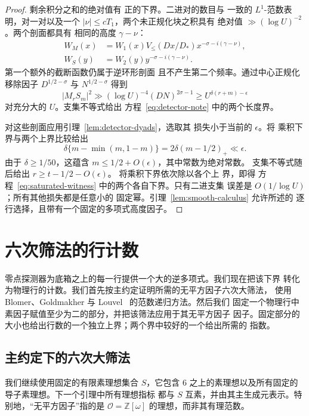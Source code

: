 \begin{proof}
剩余积分之和的绝对值有
正的下界。二进对的数目与
一致的 \(L^1\)-范数表明，对一对以及一个
\(|\nu|\le cT_1\)，两个未正规化块之积具有
绝对值 \(\gg(\log U)^{-2}\)。两个剖面都具有
相同的高度 \(\gamma-\nu\)：
\[
 \begin{split}
 W_M(x)&=W_1(x)V_{\le}(Dx/D_*)x^{-\sigma-i(\gamma-\nu)},\\
 W_S(y)&=W_2(y)y^{-\sigma-i(\gamma-\nu)}.
 \end{split}
\]
第一个额外的截断函数仍属于逆环形剖面
且不产生第二个频率。通过中心正规化移除因子
\(D^{1/2-\sigma}\) 与 \(N^{1/2-\sigma}\)
得到
\[
 |M_rS_m|^2\gg(\log U)^{-4}(DN)^{2\sigma-1}
 \ge U^{\delta(r+m)-\epsilon}
\]
对充分大的 \(U\)。支集不等式给出
方程~\eqref{eq:detector-note} 中的两个长度界。

对这些剖面应用引理~\ref{lem:detector-dyads}，选取其
损失小于当前的 \(\epsilon\)。将
乘积下界与两个上界比较给出
\[
 \delta\{m-\min(m,1-m)\}
   =2\delta(m-1/2)_+\ll\epsilon.
\]
由于 \(\delta\ge1/50\)，这蕴含
\(m\le1/2+O(\epsilon)\)，其中常数为绝对常数。
支集不等式随后给出
\(r\ge t-1/2-O(\epsilon)\)。
将乘积下界依次除以各个上
界，即得
方程~\eqref{eq:saturated-witness} 中的两个各自下界。只有二进支集
误差是 \(O(1/\log U)\)；所有其他损失都是任意小的
固定幂。引理~\ref{lem:smooth-calculus} 允许所述的
逐行选择，且带有一个固定的多项式高度因子。
\end{proof}

\section{六次筛法的行计数}\label{sec:sextic-row-count}

零点探测器为底箱之上的每一行提供一个大的逆多项式。我们现在把该下界
转化为物理行的计数。我们首先按主约定证明所需的无平方因子六次大筛法，
使用 Blomer、Goldmakher 与 Louvel~\cite[第 3 节]{BGL} 的范数递归方法。然后我们
固定一个物理行中素因子赋值至少为二的部分，并把该筛法应用于其无平方因子
因子。固定部分的大小也给出行数的一个独立上界；两个界中较好的一个给出所需的
指数。

\subsection{主约定下的六次大筛法}

我们继续使用固定的有限素理想集合 $S$，它包含
$6$ 之上的素理想以及所有固定的导子素理想。下一个引理中所有理想指标
都与 $S$ 互素，并由其主生成元表示。特别地，“无平方因子”指的是
$\mathcal O=\mathbb Z[\omega]$ 的理想，而非其有理范数。

